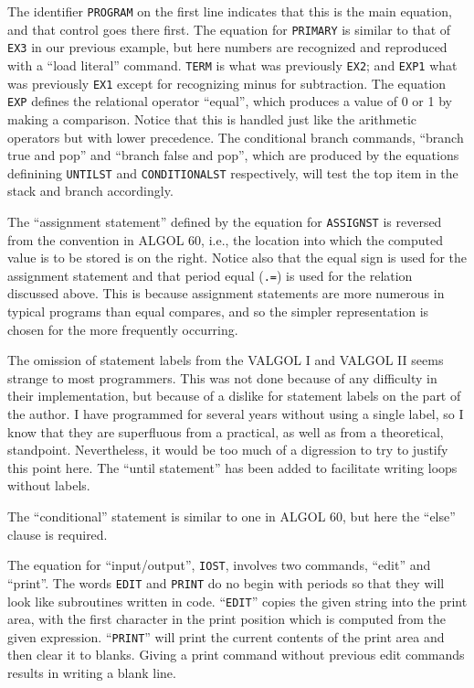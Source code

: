 \documentclass[notitlepage,twocolumn]{report}
\begin{document}
The identifier \texttt{PROGRAM} on the first line indicates that this
is the main equation, and that control goes there first. The equation
for \texttt{PRIMARY} is similar to that of \texttt{EX3} in our
previous example, but here numbers are recognized and reproduced with
a ``load literal'' command. \texttt{TERM} is what was previously
\texttt{EX2}; and \texttt{EXP1} what was previously \texttt{EX1}
except for recognizing minus for subtraction. The equation
\texttt{EXP} defines the relational operator ``equal'', which produces
a value of 0 or 1 by making a comparison. Notice that this is handled
just like the arithmetic operators but with lower precedence. The
conditional branch commands, ``branch true and pop'' and ``branch
false and pop'', which are produced by the equations definining
\texttt{UNTILST} and \texttt{CONDITIONALST} respectively, will test
the top item in the stack and branch accordingly.

The ``assignment statement'' defined by the equation for
\texttt{ASSIGNST} is reversed from the convention in ALGOL 60, i.e.,
the location into which the computed value is to be stored is on the
right. Notice also that the equal sign is used for the assignment
statement and that period equal (\texttt{.=}) is used for the relation
discussed above. This is because assignment statements are more
numerous in typical programs than equal compares, and so the simpler
representation is chosen for the more frequently occurring.

The omission of statement labels from the VALGOL I and VALGOL II seems
strange to most programmers. This was not done because of any
difficulty in their implementation, but because of a dislike for
statement labels on the part of the author. I have programmed for
several years without using a single label, so I know that they are
superfluous from a practical, as well as from a theoretical,
standpoint. Nevertheless, it would be too much of a digression to try
to justify this point here. The ``until statement'' has been added to
facilitate writing loops without labels.

The ``conditional'' statement is similar to one in ALGOL 60, but here
the ``else'' clause is required.

The equation for ``input/output'', \texttt{IOST}, involves two
commands, ``edit'' and ``print''. The words \texttt{EDIT} and
\texttt{PRINT} do no begin with periods so that they will look like
subroutines written in code. ``\texttt{EDIT}'' copies the given string
into the print area, with the first character in the print position
which is computed from the given expression. ``\texttt{PRINT}'' will
print the current contents of the print area and then clear it to
blanks. Giving a print command without previous edit commands results
in writing a blank line.
\end{document}
